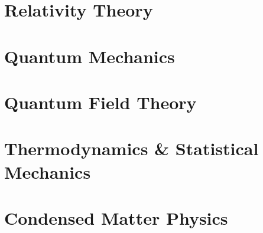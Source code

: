\documentclass[11pt, a4paper]{report}
\begin{document}
\part{Relativity Theory}


\part{Quantum Mechanics}








\part{Quantum Field Theory}


%


\part{Thermodynamics \& Statistical Mechanics}



\part{Condensed Matter Physics}


\end{document}
